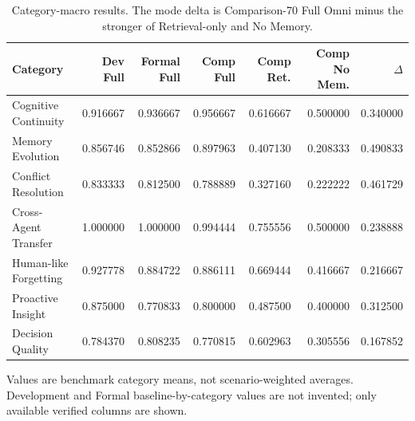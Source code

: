 \begin{table}[t]
\centering\small
\caption{Category-macro results. The mode delta is Comparison-70 Full Omni minus the stronger of Retrieval-only and No Memory.}
\label{tab:category-results}
\begin{tabular}{lrrrrrr}
\toprule
Category & Dev Full & Formal Full & Comp Full & Comp Ret. & Comp No Mem. & $\Delta$ \\
\midrule
Cognitive Continuity & 0.916667 & 0.936667 & 0.956667 & 0.616667 & 0.500000 & 0.340000 \\
Memory Evolution & 0.856746 & 0.852866 & 0.897963 & 0.407130 & 0.208333 & 0.490833 \\
Conflict Resolution & 0.833333 & 0.812500 & 0.788889 & 0.327160 & 0.222222 & 0.461729 \\
Cross-Agent Transfer & 1.000000 & 1.000000 & 0.994444 & 0.755556 & 0.500000 & 0.238888 \\
Human-like Forgetting & 0.927778 & 0.884722 & 0.886111 & 0.669444 & 0.416667 & 0.216667 \\
Proactive Insight & 0.875000 & 0.770833 & 0.800000 & 0.487500 & 0.400000 & 0.312500 \\
Decision Quality & 0.784370 & 0.808235 & 0.770815 & 0.602963 & 0.305556 & 0.167852 \\
\bottomrule
\end{tabular}
\begin{minipage}{0.98\textwidth}\footnotesize
Values are benchmark category means, not scenario-weighted averages. Development and Formal baseline-by-category values are not invented; only available verified columns are shown.
\end{minipage}
\end{table}
